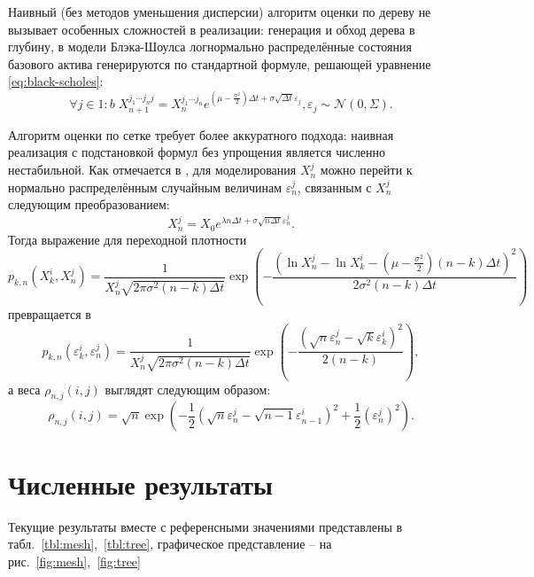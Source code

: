 \documentclass[specialist,
               substylefile = ../spbu.rtx,
               subf,href,colorlinks=true, 10pt]{disser}
\newcommand{\eps}{\varepsilon}
\newcommand{\deltat}{\Delta t}
\begin{document}
Наивный (без методов уменьшения дисперсии) алгоритм оценки по дереву не вызывает особенных сложностей в реализации: генерация и обход дерева в глубину, в модели Блэка-Шоулса логнормально распределённые состояния базового актива генерируются по стандартной формуле, решающей уравнение \eqref{eq:black-scholes}:
\begin{equation*}
\forall j \in 1\mathbin{:}b \; X_{n+1}^{j_1\cdots j_n j} = X_{n}^{j_1\cdots j_n}e^{\left(\mu - \frac{\sigma^2}{2}\right)\deltat + \sigma \sqrt{\deltat} \eps_j}, \eps_j \sim \mathcal{N}\left(0, \Sigma\right).
\end{equation*}

Алгоритм оценки по сетке требует более аккуратного подхода: наивная реализация с подстановкой формул без упрощения является численно нестабильной. Как отмечается в \cite{Kashtanov2013}, для моделирования $X_n^j$ можно перейти к нормально распределённым случайным величинам $\eps_n^j$, связанным с $X_n^j$ следующим преобразованием: 
$$X_n^j = X_0 e^{\lambda n \deltat + \sigma \sqrt{n \deltat} \eps_n^j}.$$
Тогда выражение для переходной плотности
$$p_{k, n}\left(X_k^i, X_n^j\right) = \frac{1}{X_n^j\sqrt{2\pi\sigma^2\left(n-k\right)\deltat}}\exp\left( -\frac{\left(\ln X_n^j - \ln X_k^i - \left(\mu - \frac{\sigma^2}{2}\right)\left(n - k\right)\deltat \right)^2}{2\sigma^2 \left(n - k\right)\deltat} \right)$$
превращается в 
$$p_{k, n}\left(\eps_k^i, \eps_n^j\right) = \frac{1}{X_n^j \sqrt{2\pi\sigma^2 \left(n - k\right) \deltat}} \exp\left(-\frac{\left(\sqrt{n} \eps_n^j - \sqrt{k} \eps_k^i\right)^2}{2\left(n-k\right)}\right),$$
а веса $\rho_{n, j}(i, j)$ выглядят следующим образом:
$$\rho_{n, j}(i, j) = \sqrt{n}\exp\left( 
- \frac{1}{2}\left(\sqrt{n} \eps_n^j - \sqrt{n-1} \eps_{n-1}^i\right)^2
+ \frac{1}{2}\left(\eps_n^j                                   \right)^2\right).$$

\section{Численные результаты}

Текущие результаты вместе с референсными значениями представлены в табл.~\ref{tbl:mesh},~\ref{tbl:tree}, графическое представление -- на рис.~\ref{fig:mesh},~\ref{fig:tree}
\end{document}
